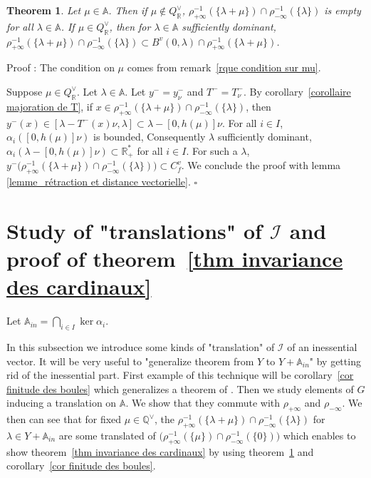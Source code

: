 \documentclass[12pt]{article}
\theoremstyle{plain}
\newtheorem{thm}{Theorem}[section] %
\theoremstyle{definition}
\newcommand{\R}{\mathbb{R}}
\newcommand{\A}{\mathbb{A}}
\newcommand{\Q}{\mathbb{Q}}
\newcommand{\I}{\mathcal{I}}
\begin{document}
\begin{thm}\label{thm inclusion}
Let $\mu\in \A$. Then if $\mu\notin Q_{\R}^\vee$, $\rho_{+\infty}^{-1}(\{\lambda+\mu\})\cap \rho_{-\infty}^{-1}(\{\lambda\})$ is empty for all $\lambda\in \A$. If $\mu\in Q^\vee_{\R}$, then for $\lambda\in \A$ sufficiently dominant, $\rho_{+\infty}^{-1}(\{\lambda+\mu\})\cap \rho_{-\infty}^{-1}(\{\lambda\})\subset B^v(0,\lambda)\cap \rho_{+\infty}^{-1}(\{\lambda+\mu\}) $. 
\end{thm}

Proof : The condition on $\mu$ comes from remark~\ref{rque condition sur mu}. 

Suppose $\mu\in Q^\vee_\R$.
Let $\lambda\in \A$. Let $y^-=y^-_\nu$ and $T^-=T_\nu^-$. By corollary~\ref{corollaire majoration de T}, if $x\in \rho_{+\infty}^{-1}(\{\lambda+\mu\})\cap \rho_{-\infty}^{-1}(\{\lambda\})$, then $y^-(x)\in [\lambda-T^-(x)\nu, \lambda]\subset \lambda-[0,h(\mu)]\nu$. 
For all $i\in I$, $\alpha_i([0,h(\mu)]\nu)$ is bounded, Consequently $\lambda$ sufficiently dominant, $\alpha_i(\lambda-[0,h(\mu)]\nu)\subset \mathbb{R}^*_+$ for all $i\in I$.  For such a $\lambda$,  $y^-\big(\rho_{+\infty}^{-1}(\{\lambda+\mu\})\cap \rho_{-\infty}^{-1}(\{\lambda\})\big)\subset C^v_f$. We conclude the proof with lemma \ref{lemme_rétraction et distance vectorielle}.
 $\square$

\section{Study of "translations" of $\I$ and proof of theorem~\ref{thm invariance des cardinaux}}\label{sect translations}

Let $\A_{in}=\bigcap_{i\in I} \ker \alpha_i$.

In this subsection we introduce some kinds of "translation" of $\I$ of an inessential vector. It will be very useful to "generalize theorem from $Y$ to $Y+\A_{in}$" by getting rid of the inessential part. First example of this technique will be corollary~\ref{cor finitude des boules} which generalizes a theorem of \cite{gaussent2014spherical}. Then we study elements of $G$ inducing a translation on $\A$. We show that they commute with $\rho_{+\infty}$ and $\rho_{-\infty}$. We then can see that for fixed $\mu\in\Q^\vee$, the $\rho_{+\infty}^{-1}(\{\lambda+\mu\})\cap\rho_{-\infty}^{-1}(\{\lambda\})$ for $\lambda\in Y+\A_{in}$ are some translated of  $\big(\rho_{+\infty}^{-1}(\{\mu\})\cap\rho_{-\infty}^{-1}(\{0\})\big)$  which enables to show theorem~\ref{thm invariance des cardinaux} by using theorem~\ref{thm inclusion} and corollary~\ref{cor finitude des boules}.
\end{document}
